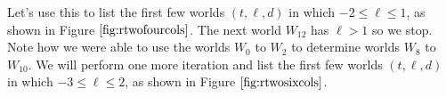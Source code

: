 \documentclass[12pt]{amsart}
\newcommand{\laa}[1]{\hspace{-0.11cm}\overleftarrow{#1}}
\newcommand{\raa}[1]{\hspace{-0.11cm}\overrightarrow{#1}}
\newcommand{\wc}{p{0cm}}
\newcommand{\wtwo}{\mathring{W}_2}
\begin{document}
Let's use this to list the first few worlds $(t, \ell, d)$ in which $-2\leq \ell \leq 1$, as shown in Figure $\ref{fig:rtwofourcols}$. The next world $W_{12}$ has $\ell > 1$ so we stop. Note how we were able to use the worlds $W_0$ to $W_2$ to determine worlds $W_8$ to $W_{10}$. We will perform one more iteration and list the first few worlds $(t, \ell, d)$ in which $-3\leq \ell \leq 2$, as shown in Figure $\ref{fig:rtwosixcols}$.

\end{document}
